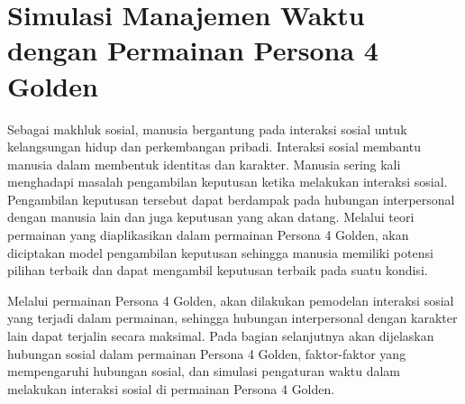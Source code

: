 \chapter{Simulasi Manajemen Waktu dengan Permainan Persona 4 Golden}
Sebagai makhluk sosial, manusia bergantung pada interaksi sosial untuk kelangsungan hidup dan perkembangan pribadi. Interaksi sosial membantu manusia dalam membentuk identitas dan karakter. Manusia sering kali menghadapi masalah pengambilan keputusan ketika melakukan interaksi sosial. Pengambilan keputusan tersebut dapat berdampak pada hubungan interpersonal dengan manusia lain dan juga keputusan yang akan datang. Melalui teori permainan yang diaplikasikan dalam permainan Persona 4 Golden, akan diciptakan model pengambilan keputusan sehingga manusia memiliki potensi pilihan terbaik dan dapat mengambil keputusan terbaik pada suatu kondisi.

Melalui permainan Persona 4 Golden, akan dilakukan pemodelan interaksi sosial yang terjadi dalam permainan, sehingga hubungan interpersonal dengan karakter lain dapat terjalin secara maksimal. Pada bagian selanjutnya akan dijelaskan hubungan sosial dalam permainan Persona 4 Golden, faktor-faktor yang mempengaruhi hubungan sosial, dan simulasi pengaturan waktu dalam melakukan interaksi sosial di permainan Persona 4 Golden.

